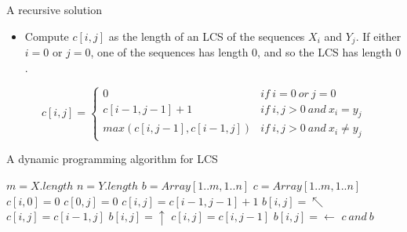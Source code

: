 \begin{frame}{A recursive solution}

  \begin{itemize}
  \item Compute $c[i,j]$ as the length of an LCS of the sequences $X_i$ and $Y_j$.
    If either $i = 0$ or $j = 0$, one of the sequences has length $0$, and so the LCS
    has length $0$. \pause
  \end{itemize}
  
\[ 
c[i,j]= \left\{
\begin{array}{ll}
      0                         & if\ i = 0\ or\ j=0 \\ 
      c[i-1,j-1] + 1            & if\ i , j > 0\ and\ x_i = y_j \\   
      max(c[i, j-1], c[i-1,j])  & if\ i , j > 0\ and\ x_i \neq y_j
\end{array} 
\right. 
\]
  
\end{frame}  

\begin{frame}{A dynamic programming algorithm for LCS}

\begin{tiny}
    \begin{algorithmic}
      \State $m = X.length$
      \State $n = Y.length$
      \State $b = Array[1..m, 1..n]$
      \State $c = Array[1..m, 1..n]$
        \State $c[i, 0] = 0$
      \EndFor
        \State $c[0, j] = 0$
      \EndFor
            \State $c[i, j] = c[i-1, j-1] + 1$
            \State $b[i, j] = \nwarrow$
            \State $c[i, j] = c[i-1, j]$
            \State $b[i, j] = \uparrow$
          \Else
            \State $c[i, j] = c[i, j-1]$
            \State $b[i, j] = \leftarrow$
         \EndIf  
       \EndFor
     \EndFor
       $c \ and\ b$    
    \EndProcedure
    \end{algorithmic}
   \end{tiny} 
\end{frame}


